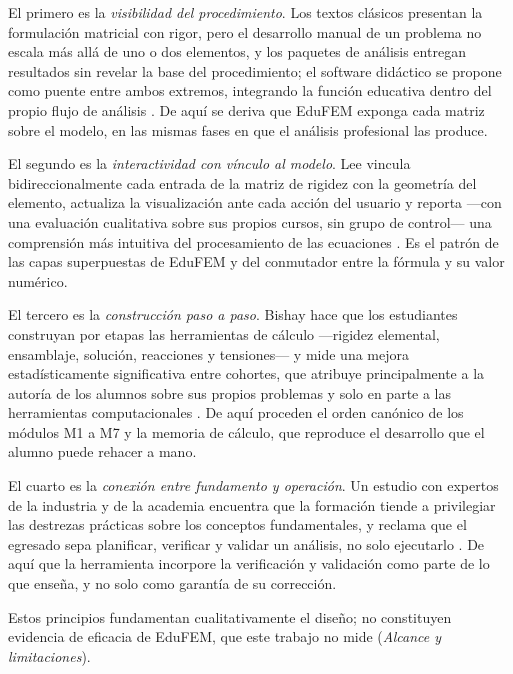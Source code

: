 El primero es la \emph{visibilidad del procedimiento}. Los textos clásicos presentan la formulación matricial con rigor, pero el desarrollo manual de un problema no escala más allá de uno o dos elementos, y los paquetes de análisis entregan resultados sin revelar la base del procedimiento; el software didáctico se propone como puente entre ambos extremos, integrando la función educativa dentro del propio flujo de análisis \autocites[p.~157]{lee2015interactive}[p.~872]{lee2015eigenmodes}[p.~2]{bishay2020teaching}. De aquí se deriva que EduFEM exponga cada matriz sobre el modelo, en las mismas fases en que el análisis profesional las produce.

El segundo es la \emph{interactividad con vínculo al modelo}. Lee vincula bidireccionalmente cada entrada de la matriz de rigidez con la geometría del elemento, actualiza la visualización ante cada acción del usuario y reporta —con una evaluación cualitativa sobre sus propios cursos, sin grupo de control— una comprensión más intuitiva del procesamiento de las ecuaciones \autocites[pp.~158, 163, 166, 168]{lee2015interactive}[p.~874]{lee2015eigenmodes}. Es el patrón de las capas superpuestas de EduFEM y del conmutador entre la fórmula y su valor numérico.

El tercero es la \emph{construcción paso a paso}. Bishay hace que los estudiantes construyan por etapas las herramientas de cálculo —rigidez elemental, ensamblaje, solución, reacciones y tensiones— y mide una mejora estadísticamente significativa entre cohortes, que atribuye principalmente a la autoría de los alumnos sobre sus propios problemas y solo en parte a las herramientas computacionales \autocite[pp.~4-5, 13, 17]{bishay2020teaching}. De aquí proceden el orden canónico de los módulos M1 a M7 y la memoria de cálculo, que reproduce el desarrollo que el alumno puede rehacer a mano.

El cuarto es la \emph{conexión entre fundamento y operación}. Un estudio con expertos de la industria y de la academia encuentra que la formación tiende a privilegiar las destrezas prácticas sobre los conceptos fundamentales, y reclama que el egresado sepa planificar, verificar y validar un análisis, no solo ejecutarlo \autocite[pp.~1159, 1168]{perezsantiago2023fem}. De aquí que la herramienta incorpore la verificación y validación como parte de lo que enseña, y no solo como garantía de su corrección.

Estos principios fundamentan cualitativamente el diseño; no constituyen evidencia de eficacia de EduFEM, que este trabajo no mide (\emph{Alcance y limitaciones}).

